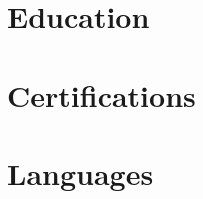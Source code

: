 \documentclass[11pt,a4paper,sans]{moderncv}
\begin{document}
\section{Education}

\section{Certifications}

\section{Languages}
\end{document}
